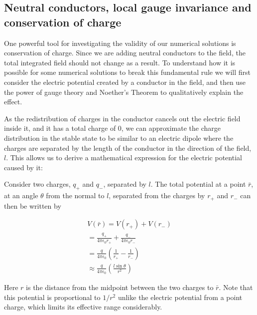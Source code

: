 \documentclass[aps,twocolumn,pre,nofootinbib,10pt]{revtex4-1}
\begin{document}
\subsection{Neutral conductors, local gauge invariance and conservation of charge}

One powerful tool for investigating the validity of our numerical solutions is conservation of charge. Since we are adding neutral conductors to the field, the total integrated field should not change as a result. To understand how it is possible for some numerical solutions to break this fundamental rule we will first consider the electric potential created by a conductor in the field, and then use the power of gauge theory and Noether's Theorem to qualitatively explain the effect.

As the redistribution of charges in the conductor cancels out the electric field inside it, and it has a total charge of 0, we can approximate the charge distribution in the stable state to be similar to an electric dipole where the charges are separated by the length of the conductor in the direction of the field, $l$. This allows us to derive a mathematical expression for the electric potential caused by it:

Consider two charges, $q_+$ and $q_-$, separated by $l$. The total potential at a point $\bar{r}$, at an angle $\theta$ from the normal to $l$, separated from the charges by $r_+$ and $r_-$ can then be written by

\begin{gather*}
V(\bar{r}) = V(r_+) + V(r_-) \\
 = \frac{q_+}{4 \pi \epsilon_0 r_+} + \frac{q_-}{4 \pi \epsilon_0 r_-} \\
 = \frac{q}{4 \pi \epsilon_0}\left( \frac{1}{r_+} - \frac{1}{r_-} \right) \\
 \approx \frac{q}{4 \pi \epsilon_0} \left( \frac{l \sin\theta}{r^2} \right) 
\end{gather*}

Here $r$ is the distance from the midpoint between the two charges to $\bar{r}$. Note that this potential is proportional to $1/r^2$ unlike the electric potential from a point charge, which limits its effective range considerably.
\end{document}
